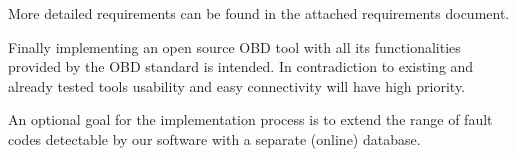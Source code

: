 More detailed requirements can be found in the attached requirements
document.

Finally implementing an open source OBD tool with all its
functionalities provided by the OBD standard is
intended. In contradiction to existing and already tested tools usability and easy
connectivity will have high priority.

An optional goal for the implementation process is to extend the range
of fault codes detectable by our software with a separate (online)
database.

